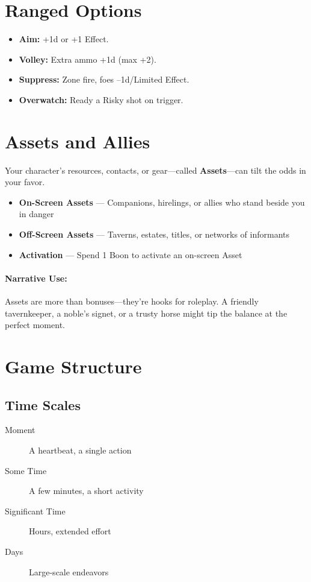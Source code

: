 \section{Ranged Options}
\begin{itemize}
  \item \textbf{Aim:} +1d or +1 Effect.  
  \item \textbf{Volley:} Extra ammo +1d (max +2).  
  \item \textbf{Suppress:} Zone fire, foes –1d/Limited Effect.  
  \item \textbf{Overwatch:} Ready a Risky shot on trigger.  
\end{itemize}

\section{Assets and Allies} 

Your character's resources, contacts, or gear—called \textbf{Assets}—can tilt the odds in your favor.

\begin{itemize}
  \item \textbf{On-Screen Assets} — Companions, hirelings, or allies who stand beside you in danger
  \item \textbf{Off-Screen Assets} — Taverns, estates, titles, or networks of informants
  \item \textbf{Activation} — Spend 1 Boon to activate an on-screen Asset
\end{itemize}

\paragraph{Narrative Use:}  
Assets are more than bonuses—they're hooks for roleplay. A friendly tavernkeeper, a noble's signet, or a trusty horse might tip the balance at the perfect moment.

\section{Game Structure} 

\subsection*{Time Scales}
\begin{description}
  \item[Moment] A heartbeat, a single action
  \item[Some Time] A few minutes, a short activity
  \item[Significant Time] Hours, extended effort
  \item[Days] Large-scale endeavors
\end{description}

